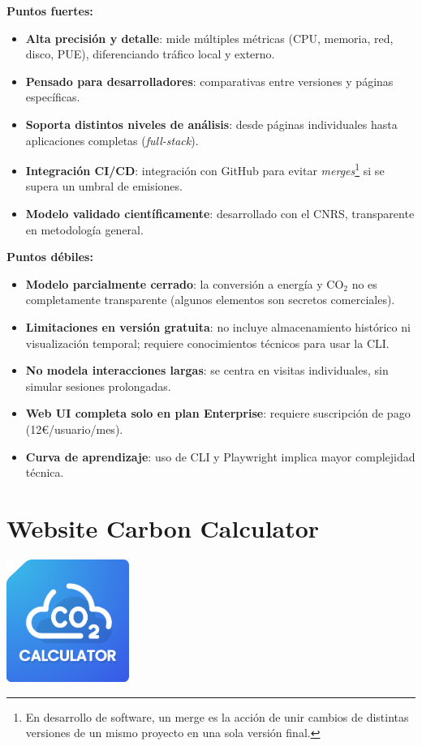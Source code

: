 \documentclass[12pt,a4paper]{report}
\begin{document}
\textbf{Puntos fuertes:}
\begin{itemize}
  \item \textbf{Alta precisión y detalle}: mide múltiples métricas (CPU, memoria, red, disco, PUE), diferenciando tráfico local y externo.
  \item \textbf{Pensado para desarrolladores}: comparativas entre versiones y páginas específicas.
  \item \textbf{Soporta distintos niveles de análisis}: desde páginas individuales hasta aplicaciones completas (\textit{full-stack}).
  \item \textbf{Integración CI/CD}: integración con GitHub para evitar \textit{merges}\footnote{En desarrollo de software, un merge es la acción de unir cambios de distintas versiones de un mismo proyecto en una sola versión final.} si se supera un umbral de emisiones.
  \item \textbf{Modelo validado científicamente}: desarrollado con el CNRS, transparente en metodología general.
\end{itemize}

\textbf{Puntos débiles:}
\begin{itemize}
  \item \textbf{Modelo parcialmente cerrado}: la conversión a energía y CO$_2$ no es completamente transparente (algunos elementos son secretos comerciales).
  \item \textbf{Limitaciones en versión gratuita}: no incluye almacenamiento histórico ni visualización temporal; requiere conocimientos técnicos para usar la CLI.
  \item \textbf{No modela interacciones largas}: se centra en visitas individuales, sin simular sesiones prolongadas.
  \item \textbf{Web UI completa solo en plan Enterprise}: requiere suscripción de pago
        (12€/usuario/mes).
  \item \textbf{Curva de aprendizaje}: uso de CLI y Playwright implica mayor complejidad técnica.
\end{itemize}

\section*{\textbf{Website Carbon Calculator}}

\begin{center}
\includegraphics[width=0.3\textwidth]{imagenes/Website_Logo.png}
\end{center}
\end{document}
